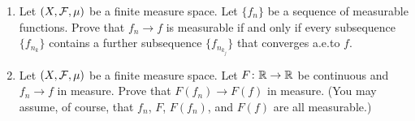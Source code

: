 \begin{problem}
  \hfill
  \begin{enumerate}[label=(\roman*)]
  \item Let $(X,\mathcal{F},\mu)$ be a finite measure space. Let $\{f_n\}$ be a
    sequence of measurable functions. Prove that $f_n\to f$ is measurable
    if and only if every subsequence $\{f_{n_k}\}$ contains a further
    subsequence $\{f_{n_{k_j}}\}$ that converges a.e.\@ to $f$.
  \item Let $(X,\mathcal{F},\mu)$ be a finite measure space. Let
    $F\colon\mathbb{R}\to\mathbb{R}$ be continuous and $f_n\to f$ in measure. Prove
    that $F(f_n)\to F(f)$ in measure. (You may assume, of course, that
    $f_n$, $F$, $F(f_n)$, and $F(f)$ are all measurable.)
  \end{enumerate}
\end{problem}
